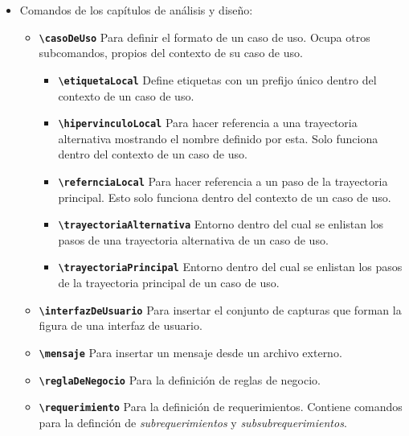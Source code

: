 \begin{itemize}
  \item Comandos de los capítulos de análisis y diseño:

    \begin{itemize}

      \item \textbf{\texttt{{\textbackslash}casoDeUso}}
        Para definir el formato de un caso de uso. Ocupa otros subcomandos,
        propios del contexto de su caso de uso.

        \begin{itemize}

          \item \textbf{\texttt{{\textbackslash}etiquetaLocal}}
            Define etiquetas con un prefijo único dentro del contexto de
            un caso de uso.

          \item \textbf{\texttt{{\textbackslash}hipervinculoLocal}}
            Para hacer referencia a una trayectoria alternativa mostrando
            el nombre definido por esta. Solo funciona dentro del
            contexto de un caso de uso.

          \item \textbf{\texttt{{\textbackslash}refernciaLocal}}
            Para hacer referencia a un paso de la trayectoria principal. Esto
            solo funciona dentro del contexto de un caso de uso.

          \item \textbf{\texttt{{\textbackslash}trayectoriaAlternativa}}
            Entorno dentro del cual se enlistan los pasos de una trayectoria
            alternativa de un caso de uso.

          \item \textbf{\texttt{{\textbackslash}trayectoriaPrincipal}}
            Entorno dentro del cual se enlistan los pasos de la trayectoria
            principal de un caso de uso.

        \end{itemize}

      \item \textbf{\texttt{{\textbackslash}interfazDeUsuario}}
        Para insertar el conjunto de capturas que forman la figura de una
        interfaz de usuario.

      \item \textbf{\texttt{{\textbackslash}mensaje}}
        Para insertar un mensaje desde un archivo externo.

      \item \textbf{\texttt{{\textbackslash}reglaDeNegocio}}
        Para la definición de reglas de negocio.

      \item \textbf{\texttt{{\textbackslash}requerimiento}}
        Para la definición de requerimientos. Contiene comandos para la
        definción de \textit{subrequerimientos} y \textit{subsubrequerimientos}.

    \end{itemize}

\end{itemize}

